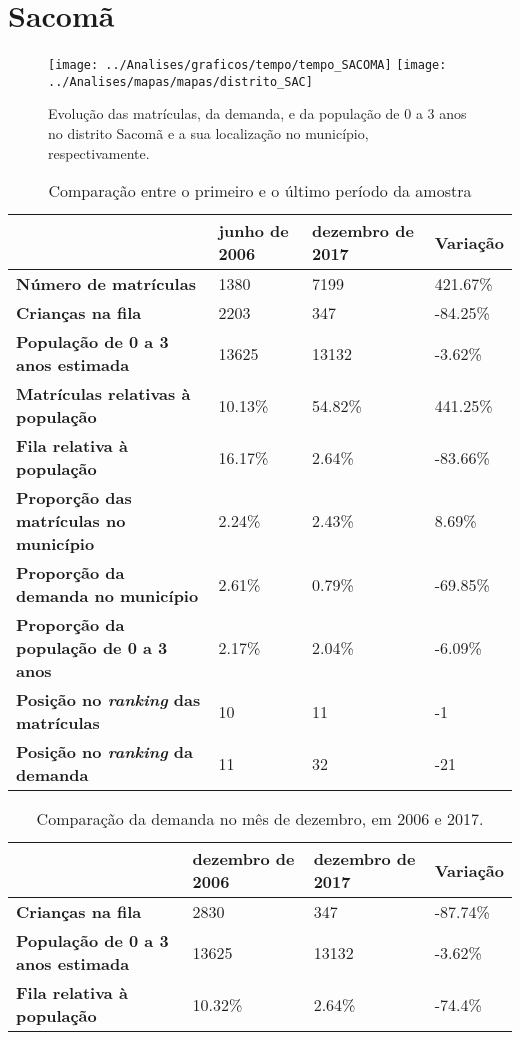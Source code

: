 \section{Sacomã}
\begin{figure}[H]
	\centering
	\texttt{[image: ../Analises/graficos/tempo/tempo\_SACOMA]}
	\texttt{[image: ../Analises/mapas/mapas/distrito\_SAC]}
	\caption{Evolução das matrículas, da demanda, e da população de 0 a 3 anos no distrito Sacomã e a sua localização no município, respectivamente.}
\end{figure}
\begin{table}[H]
	\begin{tabular}{|l|l|l|l|}
		\hline
		\textbf{}                                      & \textbf{junho de 2006}       & \textbf{dezembro de 2017}    & \textbf{Variação} \\ \hline
		\textbf{Número de matrículas}                  & 1380 & 7199 & 421.67\% \\ \hline
		\textbf{Crianças na fila}                      & 2203 & 347 & -84.25\% \\ \hline
		\textbf{População de 0 a 3 anos estimada}      & 13625 & 13132 & -3.62\% \\ \hline
		\textbf{Matrículas relativas à população}      & 10.13\% & 54.82\% & 441.25\% \\ \hline
		\textbf{Fila relativa à população}             & 16.17\% & 2.64\% & -83.66\% \\ \hline
		\textbf{Proporção das matrículas no município} & 2.24\% & 2.43\% & 8.69\% \\ \hline
		\textbf{Proporção da demanda no município}     & 2.61\% & 0.79\% & -69.85\% \\ \hline
		\textbf{Proporção da população de 0 a 3 anos}  & 2.17\% & 2.04\% & -6.09\% \\ \hline
		\textbf{Posição no \textit{ranking} das matrículas}     & 10 & 11 & -1 \\ \hline
		\textbf{Posição no \textit{ranking} da demanda}         & 11 & 32 & -21 \\ \hline
	\end{tabular}
	\caption{Comparação entre o primeiro e o último período da amostra}
\end{table}
\begin{table}[H]
	\begin{tabular}{|l|l|l|l|}
		\hline
		\textbf{}                                 & \textbf{dezembro de 2006} & \textbf{dezembro de 2017} & \textbf{Variação} \\ \hline
		\textbf{Crianças na fila}                      & 2830 & 347 & -87.74\% \\ \hline
		\textbf{População de 0 a 3 anos estimada}      & 13625 & 13132 & -3.62\% \\ \hline
		\textbf{Fila relativa à população}             & 10.32\% & 2.64\% & -74.4\% \\ \hline
	\end{tabular}
	\caption{Comparação da demanda no mês de dezembro, em 2006 e 2017.}
\end{table}
